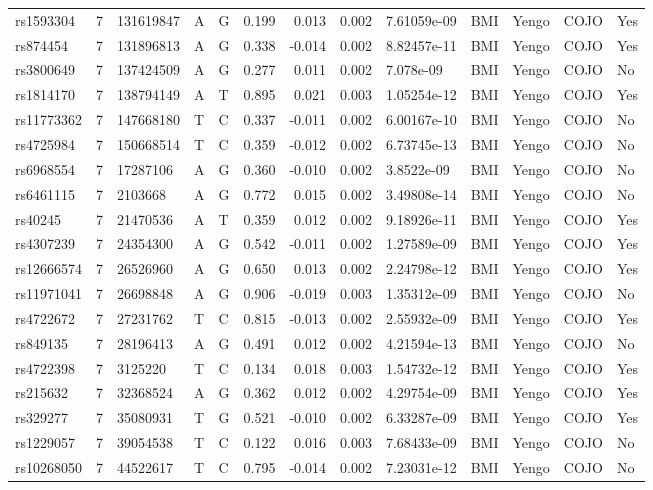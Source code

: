 \documentclass[11pt,twoside]{bristolthesis}
\begin{document}
\begin{longtable}[t]{lrlllrrrlllll}
\addlinespace
rs1593304 & 7 & 131619847 & A & G & 0.199 & 0.013 & 0.002 & 7.61059e-09 & BMI & Yengo & COJO & Yes\\
rs874454 & 7 & 131896813 & A & G & 0.338 & -0.014 & 0.002 & 8.82457e-11 & BMI & Yengo & COJO & Yes\\
rs3800649 & 7 & 137424509 & A & G & 0.277 & 0.011 & 0.002 & 7.078e-09 & BMI & Yengo & COJO & No\\
rs1814170 & 7 & 138794149 & A & T & 0.895 & 0.021 & 0.003 & 1.05254e-12 & BMI & Yengo & COJO & Yes\\
rs11773362 & 7 & 147668180 & T & C & 0.337 & -0.011 & 0.002 & 6.00167e-10 & BMI & Yengo & COJO & No\\
\addlinespace
rs4725984 & 7 & 150668514 & T & C & 0.359 & -0.012 & 0.002 & 6.73745e-13 & BMI & Yengo & COJO & No\\
rs6968554 & 7 & 17287106 & A & G & 0.360 & -0.010 & 0.002 & 3.8522e-09 & BMI & Yengo & COJO & No\\
rs6461115 & 7 & 2103668 & A & G & 0.772 & 0.015 & 0.002 & 3.49808e-14 & BMI & Yengo & COJO & No\\
rs40245 & 7 & 21470536 & A & T & 0.359 & 0.012 & 0.002 & 9.18926e-11 & BMI & Yengo & COJO & Yes\\
rs4307239 & 7 & 24354300 & A & G & 0.542 & -0.011 & 0.002 & 1.27589e-09 & BMI & Yengo & COJO & Yes\\
\addlinespace
rs12666574 & 7 & 26526960 & A & G & 0.650 & 0.013 & 0.002 & 2.24798e-12 & BMI & Yengo & COJO & Yes\\
rs11971041 & 7 & 26698848 & A & G & 0.906 & -0.019 & 0.003 & 1.35312e-09 & BMI & Yengo & COJO & No\\
rs4722672 & 7 & 27231762 & T & C & 0.815 & -0.013 & 0.002 & 2.55932e-09 & BMI & Yengo & COJO & Yes\\
rs849135 & 7 & 28196413 & A & G & 0.491 & 0.012 & 0.002 & 4.21594e-13 & BMI & Yengo & COJO & No\\
rs4722398 & 7 & 3125220 & T & C & 0.134 & 0.018 & 0.003 & 1.54732e-12 & BMI & Yengo & COJO & Yes\\
\addlinespace
rs215632 & 7 & 32368524 & A & G & 0.362 & 0.012 & 0.002 & 4.29754e-09 & BMI & Yengo & COJO & Yes\\
rs329277 & 7 & 35080931 & T & G & 0.521 & -0.010 & 0.002 & 6.33287e-09 & BMI & Yengo & COJO & Yes\\
rs1229057 & 7 & 39054538 & T & C & 0.122 & 0.016 & 0.003 & 7.68433e-09 & BMI & Yengo & COJO & No\\
rs10268050 & 7 & 44522617 & T & C & 0.795 & -0.014 & 0.002 & 7.23031e-12 & BMI & Yengo & COJO & No\\

\end{longtable}
\end{document}
